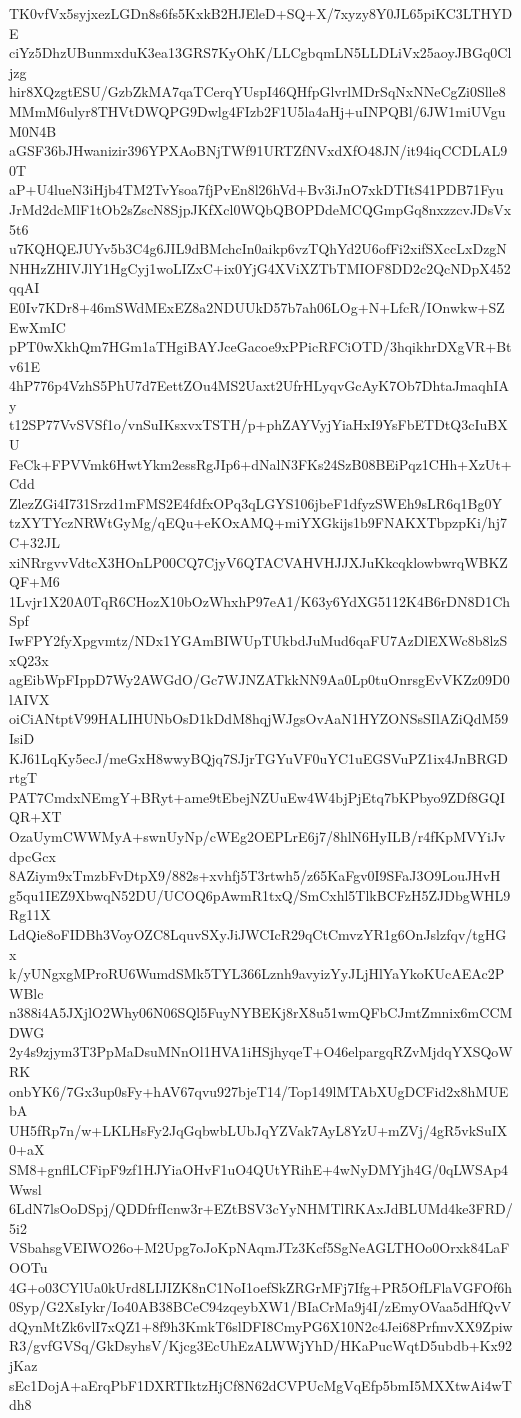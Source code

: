 TK0vfVx5syjxezLGDn8s6fs5KxkB2HJEleD+SQ+X/7xyzy8Y0JL65piKC3LTHYDE
ciYz5DhzUBunmxduK3ea13GRS7KyOhK/LLCgbqmLN5LLDLiVx25aoyJBGq0Cljzg
hir8XQzgtESU/GzbZkMA7qaTCerqYUspI46QHfpGlvrlMDrSqNxNNeCgZi0Slle8
MMmM6ulyr8THVtDWQPG9Dwlg4FIzb2F1U5la4aHj+uINPQBl/6JW1miUVguM0N4B
aGSF36bJHwanizir396YPXAoBNjTWf91URTZfNVxdXfO48JN/it94iqCCDLAL90T
aP+U4lueN3iHjb4TM2TvYsoa7fjPvEn8l26hVd+Bv3iJnO7xkDTItS41PDB71Fyu
JrMd2dcMlF1tOb2sZscN8SjpJKfXcl0WQbQBOPDdeMCQGmpGq8nxzzcvJDsVx5t6
u7KQHQEJUYv5b3C4g6JIL9dBMchcIn0aikp6vzTQhYd2U6ofFi2xifSXccLxDzgN
NHHzZHIVJlY1HgCyj1woLIZxC+ix0YjG4XViXZTbTMIOF8DD2c2QcNDpX452qqAI
E0Iv7KDr8+46mSWdMExEZ8a2NDUUkD57b7ah06LOg+N+LfcR/IOnwkw+SZEwXmIC
pPT0wXkhQm7HGm1aTHgiBAYJceGacoe9xPPicRFCiOTD/3hqikhrDXgVR+Btv61E
4hP776p4VzhS5PhU7d7EettZOu4MS2Uaxt2UfrHLyqvGcAyK7Ob7DhtaJmaqhIAy
t12SP77VvSVSf1o/vnSuIKsxvxTSTH/p+phZAYVyjYiaHxI9YsFbETDtQ3cIuBXU
FeCk+FPVVmk6HwtYkm2essRgJIp6+dNalN3FKs24SzB08BEiPqz1CHh+XzUt+Cdd
ZlezZGi4I731Srzd1mFMS2E4fdfxOPq3qLGYS106jbeF1dfyzSWEh9sLR6q1Bg0Y
tzXYTYczNRWtGyMg/qEQu+eKOxAMQ+miYXGkijs1b9FNAKXTbpzpKi/hj7C+32JL
xiNRrgvvVdtcX3HOnLP00CQ7CjyV6QTACVAHVHJJXJuKkcqklowbwrqWBKZQF+M6
1Lvjr1X20A0TqR6CHozX10bOzWhxhP97eA1/K63y6YdXG5112K4B6rDN8D1ChSpf
IwFPY2fyXpgvmtz/NDx1YGAmBIWUpTUkbdJuMud6qaFU7AzDlEXWc8b8lzSxQ23x
agEibWpFIppD7Wy2AWGdO/Gc7WJNZATkkNN9Aa0Lp0tuOnrsgEvVKZz09D0lAIVX
oiCiANtptV99HALIHUNbOsD1kDdM8hqjWJgsOvAaN1HYZONSsSIlAZiQdM59IsiD
KJ61LqKy5ecJ/meGxH8wwyBQjq7SJjrTGYuVF0uYC1uEGSVuPZ1ix4JnBRGDrtgT
PAT7CmdxNEmgY+BRyt+ame9tEbejNZUuEw4W4bjPjEtq7bKPbyo9ZDf8GQIQR+XT
OzaUymCWWMyA+swnUyNp/cWEg2OEPLrE6j7/8hlN6HyILB/r4fKpMVYiJvdpcGcx
8AZiym9xTmzbFvDtpX9/882s+xvhfj5T3rtwh5/z65KaFgv0I9SFaJ3O9LouJHvH
g5qu1IEZ9XbwqN52DU/UCOQ6pAwmR1txQ/SmCxhl5TlkBCFzH5ZJDbgWHL9Rg11X
LdQie8oFIDBh3VoyOZC8LquvSXyJiJWCIcR29qCtCmvzYR1g6OnJslzfqv/tgHGx
k/yUNgxgMProRU6WumdSMk5TYL366Lznh9avyizYyJLjHlYaYkoKUcAEAc2PWBlc
n388i4A5JXjlO2Why06N06SQl5FuyNYBEKj8rX8u51wmQFbCJmtZmnix6mCCMDWG
2y4s9zjym3T3PpMaDsuMNnOl1HVA1iHSjhyqeT+O46elpargqRZvMjdqYXSQoWRK
onbYK6/7Gx3up0sFy+hAV67qvu927bjeT14/Top149lMTAbXUgDCFid2x8hMUEbA
UH5fRp7n/w+LKLHsFy2JqGqbwbLUbJqYZVak7AyL8YzU+mZVj/4gR5vkSuIX0+aX
SM8+gnflLCFipF9zf1HJYiaOHvF1uO4QUtYRihE+4wNyDMYjh4G/0qLWSAp4Wwsl
6LdN7lsOoDSpj/QDDfrfIcnw3r+EZtBSV3cYyNHMTlRKAxJdBLUMd4ke3FRD/5i2
VSbahsgVEIWO26o+M2Upg7oJoKpNAqmJTz3Kcf5SgNeAGLTHOo0Orxk84LaFOOTu
4G+o03CYlUa0kUrd8LIJIZK8nC1NoI1oefSkZRGrMFj7Ifg+PR5OfLFlaVGFOf6h
0Syp/G2XsIykr/Io40AB38BCeC94zqeybXW1/BIaCrMa9j4I/zEmyOVaa5dHfQvV
dQynMtZk6vlI7xQZ1+8f9h3KmkT6slDFI8CmyPG6X10N2c4Jei68PrfmvXX9Zpiw
R3/gvfGVSq/GkDsyhsV/Kjcg3EcUhEzALWWjYhD/HKaPucWqtD5ubdb+Kx92jKaz
sEc1DojA+aErqPbF1DXRTIktzHjCf8N62dCVPUcMgVqEfp5bmI5MXXtwAi4wTdh8
